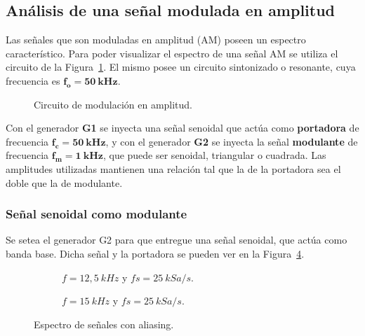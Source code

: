   \pagebreak
  \subsection{Análisis de una señal modulada en amplitud}
    Las señales que son moduladas en amplitud (AM) poseen un espectro característico. Para poder visualizar
    el espectro de una señal AM se utiliza el circuito de la Figura~\ref{fig:ModuladorAM}. El mismo posee un
    circuito sintonizado o resonante, cuya frecuencia es $\mathbf{f_o = 50~kHz}$.

    \begin{figure}[H]
      \centering
      \caption{Circuito de modulación en amplitud.}
      \label{fig:ModuladorAM}
    \end{figure}

    Con el generador \textbf{G1} se inyecta una señal senoidal que actúa como \textbf{portadora} de frecuencia 
    $\mathbf{f_c=50~kHz}$, y con el generador \textbf{G2} se inyecta la señal \textbf{modulante} de frecuencia
    $\mathbf{f_m=1~kHz}$, que puede ser senoidal, triangular o cuadrada. Las amplitudes utilizadas mantienen 
    una relación tal que la de la portadora sea el doble que la de modulante.

    \subsubsection*{Señal senoidal como modulante}
      Se setea el generador G2 para que entregue una señal senoidal, que actúa como banda base. Dicha señal
      y la portadora se pueden ver en la Figura~\ref{fig:SeñalesParaAM1}.
      
      \begin{figure}[H]
        \centering
        \begin{subfigure}[H]{0.48\textwidth}
          \caption{$f=12,5~kHz$ y $fs=25~kSa/s$.}
          \label{fig:PortadoraEnTiempo}
        \end{subfigure}
        \hfill 
        \begin{subfigure}[H]{0.48\textwidth}
          \caption{$f=15~kHz$ y $fs=25~kSa/s$.}
          \label{fig:SenoModulanteEnTiempo}
        \end{subfigure}
      
        \caption{Espectro de señales con aliasing.}
        \label{fig:SeñalesParaAM1}
      \end{figure}
        

